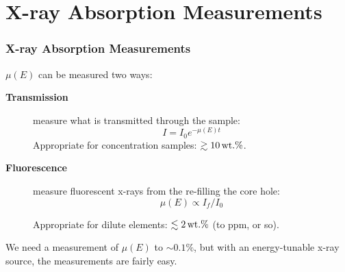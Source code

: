 \section{X-ray Absorption Measurements}
\begin{frame} \frametitle{X-ray Absorption Measurements}

  \begin{center}
    {}
  \end{center}

  $\mu(E)$ can be measured two ways:

  \vmm

  \begin{description}
  \item[{\bf{Transmission}}]  measure what is transmitted through the sample:  \vspace{-2mm}
    \[    I = I_0 e^{-\mu(E)t}  \]
    Appropriate for concentration samples:  $ \gtrsim 10 \rm\, wt.\%$.
  \item[{\bf{Fluorescence}}] measure fluorescent x-rays from the re-filling the core hole:\vspace{-2mm}
    \[      \mu(E)  \propto I_f/I_0     \]

    Appropriate for dilute elements:  $ \lesssim 2 \rm\, wt.\%$ (to ppm, or so).
  \end{description}

    \vmm

    \begin{postitbox}{85mm}
      We need a measurement of $\mu(E)$ to $\sim 0.1\%$, but with
      an energy-tunable x-ray source, the measurements are fairly easy.
    \end{postitbox}

\vfill
\end{frame}
